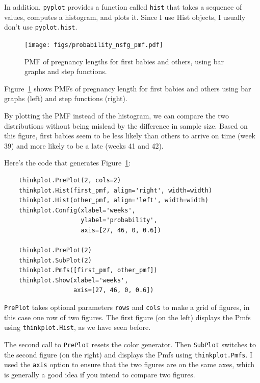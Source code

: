 \documentclass[12pt]{book}
\theoremstyle{exercise}
\begin{document}
In addition, {\tt pyplot} provides a function called {\tt hist} that
takes a sequence of values, computes a histogram, and plots it.
Since I use Hist objects, I usually don't use {\tt pyplot.hist}.%

\begin{figure}
\centerline{\texttt{[image: figs/probability\_nsfg\_pmf.pdf]}}
\caption{PMF of pregnancy lengths for first babies and others, using
  bar graphs and step functions.}%
\label{probability_nsfg_pmf}
\end{figure}%
%

Figure~\ref{probability_nsfg_pmf} shows PMFs of pregnancy length for
first babies and others using bar graphs (left) and step functions
(right).%

By plotting the PMF instead of the histogram, we can compare the two
distributions without being mislead by the difference in sample
size.  Based on this figure, first babies seem to be less likely than
others to arrive on time (week 39) and more likely to be a late (weeks
41 and 42).

Here's the code that generates Figure~\ref{probability_nsfg_pmf}:

\begin{verbatim}
    thinkplot.PrePlot(2, cols=2)
    thinkplot.Hist(first_pmf, align='right', width=width)
    thinkplot.Hist(other_pmf, align='left', width=width)
    thinkplot.Config(xlabel='weeks',
                     ylabel='probability',
                     axis=[27, 46, 0, 0.6])

    thinkplot.PrePlot(2)
    thinkplot.SubPlot(2)
    thinkplot.Pmfs([first_pmf, other_pmf])
    thinkplot.Show(xlabel='weeks',
                   axis=[27, 46, 0, 0.6])
\end{verbatim}

{\tt PrePlot} takes optional parameters {\tt rows} and {\tt cols}
to make a grid of figures, in this case one row of two figures.
The first figure (on the left) displays the Pmfs using {\tt thinkplot.Hist},
as we have seen before.%
%

The second call to {\tt PrePlot} resets the color generator.  Then
{\tt SubPlot} switches to the second figure (on the right) and
displays the Pmfs using {\tt thinkplot.Pmfs}.  I used the {\tt axis} option
to ensure that the two figures are on the same axes, which is
generally a good idea if you intend to compare two figures.
\end{document}
